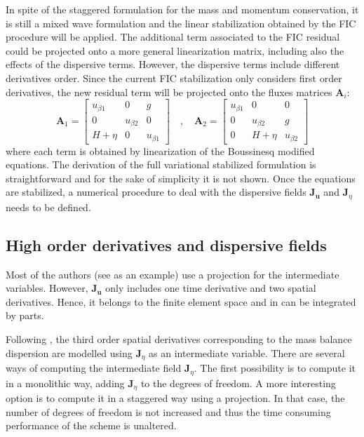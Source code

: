 In spite of the staggered formulation for the mass and momentum conservation, it is still a mixed wave formulation and the linear stabilization obtained by the FIC procedure will be applied. The additional term associated to the FIC residual could be projected onto a more general linearization matrix, including also the effects of the dispersive terms. However, the dispersive terms include different derivatives order. Since the current FIC stabilization only considers first order derivatives, the new residual term will be projected onto the fluxes matrices $\mathbf{A}_i$:
\begin{equation}
    \mathbf{A}_1 = \left[\begin{array}{ccc}
        u_{\beta1} &  0         &  g      \\
         0         & u_{\beta2} &  0      \\
         H+\eta    &  0         & u_{\beta1}
    \end{array}\right] \quad , \quad
    \mathbf{A}_2 = \left[\begin{array}{ccc}
        u_{\beta1} &  0         &  0      \\
         0         & u_{\beta2} &  g      \\
         0         & H+\eta     & u_{\beta2}
    \end{array}\right]
\end{equation}
where each term is obtained by linearization of the Boussinesq modified equations. The derivation of the full variational stabilized formulation is straightforward and for the sake of simplicity it is not shown. Once the equations are stabilized, a numerical procedure to deal with the dispersive fields $\mathbf{J}_{\mathbf{u}}$ and $\mathbf{J}_\eta$ needs to be defined.



\subsection{High order derivatives and dispersive fields}


Most of the authors (see \cite{li1999,codina2008b} as an example) use a projection for the intermediate variables. However, $\mathbf{J}_{\mathbf{u}}$ only includes one time derivative and two spatial derivatives. Hence, it belongs to the finite element space and in can be integrated by parts.

Following \cite{walkley2002}, the third order spatial derivatives corresponding to the mass balance dispersion are modelled using $\mathbf{J}_\eta$ as an intermediate variable. There are several ways of computing the intermediate field $\mathbf{J}_\eta$. The first possibility is to compute it in a monolithic way, adding $\mathbf{J}_\eta$ to the degrees of freedom.
A more interesting option is to compute it in a staggered way using a projection. In that case, the number of degrees of freedom is not increased and thus the time consuming performance of the scheme is unaltered. 


